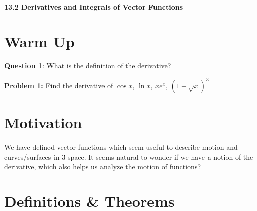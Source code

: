 \documentclass[11pt]{article}
\newcommand{\vs}{\vspace*{.1in}}
\begin{document}
\begin{LARGE}\begin{center}\bf 13.2 Derivatives and Integrals of Vector Functions\end{center}
\end{LARGE}

\vs\vs



\section{Warm Up}

\textbf{Question 1}: What is the definition of the derivative?

\textbf{Problem 1:} Find the derivative of $\cos{x}$, $\ln{x}$, $xe^x$, $(1+\sqrt{x})^3$

\section{Motivation}

We have defined vector functions which seem useful to describe motion and curves/surfaces in 3-space. It seems natural to wonder if we have a notion of the derivative, which also helps us analyze the motion of functions?




\section{Definitions \& Theorems}
\end{document}
